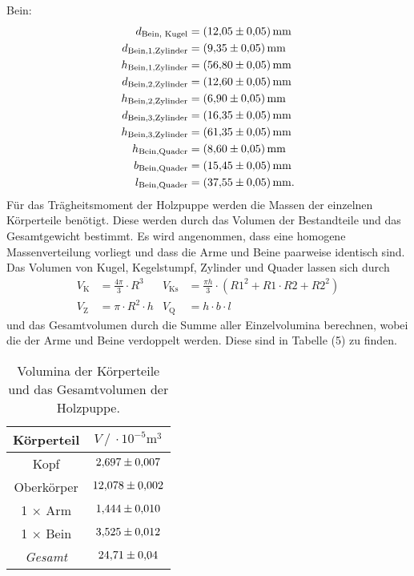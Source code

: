Bein:\\
\begin{align*}
d_{\text{Bein, Kugel}} &= (\num{12.05 +- 0.05})\,\si{\milli\meter} \\
d_{\text{Bein,1,Zylinder}} &= (\num{9.35 +- 0.05})\,\si{\milli\meter} \\
h_{\text{Bein,1,Zylinder}} &= (\num{56.8 +- 0.05})\,\si{\milli\meter} \\
d_{\text{Bein,2,Zylinder}} &= (\num{12.6 +- 0.05})\,\si{\milli\meter} \\
h_{\text{Bein,2,Zylinder}} &= (\num{6.9 +- 0.05})\,\si{\milli\meter} \\
d_{\text{Bein,3,Zylinder}} &= (\num{16.35 +- 0.05})\,\si{\milli\meter} \\
h_{\text{Bein,3,Zylinder}} &= (\num{61.35 +- 0.05})\,\si{\milli\meter} \\
h_{\text{Bein,Quader}} &= (\num{8.6 +- 0.05})\,\si{\milli\meter} \\
b_{\text{Bein,Quader}} &= (\num{15.45 +- 0.05})\,\si{\milli\meter} \\
l_{\text{Bein,Quader}} &= (\num{37.55 +- 0.05})\,\si{\milli\meter}.
\end{align*}
Für das Trägheitsmoment der Holzpuppe werden die Massen der einzelnen Körperteile benötigt.
Diese werden durch das Volumen der Bestandteile und das Gesamtgewicht bestimmt. Es wird angenommen,
dass eine homogene Massenverteilung vorliegt und dass die Arme und Beine paarweise identisch sind.
Das Volumen von Kugel, Kegelstumpf, Zylinder und Quader lassen sich durch
\begin{align*}
V_\text{K} &= \frac{4\pi}{3} \cdot R^3 &
V_\text{Ks} &= \frac{\pi h}{3} \cdot (R1^2 + R1 \cdot R2 + R2^2) \\
V_\text{Z} &= \pi \cdot R^2 \cdot h &
V_\text{Q} &= h \cdot b \cdot l
\end{align*}
und das Gesamtvolumen durch die Summe aller Einzelvolumina berechnen, wobei die der Arme und Beine
verdoppelt werden. Diese sind in Tabelle (5) zu finden.
\begin{table}[H]
\centering
\caption{Volumina der Körperteile und das Gesamtvolumen der Holzpuppe.}
\label{tab:puppe1}
\begin{tabular}{c c}
\toprule
Körperteil & $V \:/\: \cdot 10^{-5} \si{\cubic\meter}$ \\
\midrule
Kopf & $\num{2.697 +- 0.007}$ \\
Oberkörper & $\num{12.078 +- 0.002}$ \\
1 $\times$ Arm & $\num{1.444 +- 0.01}$ \\
1 $\times$ Bein & $\num{3.525 +- 0.012}$ \\
\midrule
\textit{Gesamt} & $\num{24.71 +- 0.04}$ \\
\bottomrule
\end{tabular}
\end{table}

